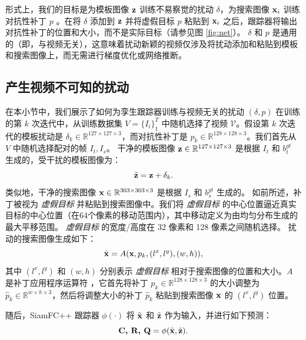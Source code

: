 形式上，我们的目标是为模板图像 $\textbf z$ 训练不易察觉的扰动 $\delta$，为搜索图像 $\textbf x_i$ 训练对抗性补丁 $p$ 。在将 $\delta$ 添加到 $\textbf z$ 并将虚假目标 $p$ 粘贴到 $\textbf x_i$ 之后，跟踪器将输出对抗性补丁的位置和大小，而不是实际目标（请参见图 \ref{fig:net}）。
$\delta$ 和 $p$ 是通用的（即，与视频无关），这意味着扰动新颖的视频仅涉及将扰动添加和粘贴到模板和搜索图像上，而无需进行梯度优化或网络推断。

\subsection{产生视频不可知的扰动}

在本小节中，我们展示了如何为孪生跟踪器训练与视频无关的扰动 $(\delta, p)$ 在训练的第 $k$ 次迭代中，从训练数据集 $V=\{I_i\}_1^T$ 中随机选择了视频 $\mathcal V$。假设第 $k$ 次迭代的模板扰动是 $\delta_k \in \mathbb{R}^{127\times 127 \times 3}$，而对抗性补丁是 $p_k \in \mathbb{R}^{128\times 128\times 3}$。我们首先从 $V$ 中随机选择配对的帧 $I_t, I_s$。
干净的模板图像 $\textbf z\in \mathbb{R}^{127\times 127 \times 3}$ 是根据 $I_t$ 和 $b^{gt}_t$ 生成的，受干扰的模板图像为：
\begin{equation}
\tilde {\textbf z} = \textbf z + \delta_k.
\end{equation}
类似地，干净的搜索图像 $\textbf x \in \mathbb{R}^{303\times 303 \times 3}$ 是根据 $I_s$ 和 $b^{gt}_s$ 生成的。
如前所述，补丁被视为 \textit{虚假目标} 并粘贴到搜索图像中。我们将 \textit{虚假目标} 的中心位置逼近真实目标的中心位置（在64个像素的移动范围内），其中移动定义为由均匀分布生成的最大平移范围。
\textit{虚假目标} 的宽度/高度在 32 像素和 128 像素之间随机选择。
扰动的搜索图像生成如下：
\begin{equation}
\tilde{\textbf x} = A(\textbf x, p_k, (l^x, l^y), (w, h)),
\end{equation}
其中 $(l^x, l^y)$ 和 $(w, h)$ 分别表示 \textit{虚假目标} 相对于搜索图像的位置和大小。$A$ 是补丁应用程序运算符 \cite{patch}，它首先将补丁 $p_k \in \mathbb{R}^{128\times 128\times 3}$ 的大小调整为 $\hat{p}_k \in \mathbb{R}^{w\times h\times 3}$，然后将调整大小的补丁 $\hat{p}_k$ 粘贴到搜索图像 $\textbf x$ 的 $(l^x,l^y)$ 位置。

随后，SiamFC++ 跟踪器 $\phi(\cdot)$ 将 $\tilde {\textbf x}$ 和 $\tilde{\textbf z}$ 作为输入，并进行如下预测：
\begin{equation}
\textbf{C, R, Q} = \phi(\tilde {\textbf x}, \tilde{\textbf z}).
\end{equation}

